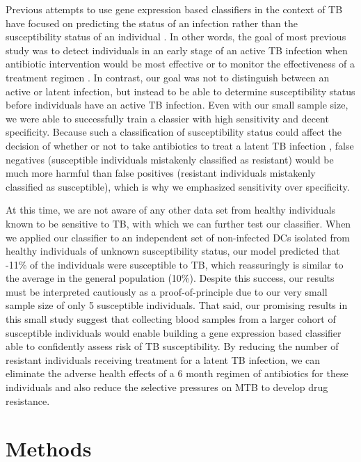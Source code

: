\documentclass[fleqn,10pt]{wlscirep}
\begin{document}
Previous attempts to use gene expression based classifiers in the
context of TB have focused on predicting the status of an infection
rather than the susceptibility status of an individual
\cite{Berry2010, OGarra2013, Blankley2014}. In other words, the goal
of most previous study was to detect individuals in an early stage of
an active TB infection when antibiotic intervention would be most
effective or to monitor the effectiveness of a treatment regimen
\cite{Maertzdorf2015}. In contrast, our goal was not to distinguish
between an active or latent infection, but instead to be able to
determine susceptibility status before individuals have an active TB
infection. Even with our small sample size, we were able to
successfully train a classier with high sensitivity and decent
specificity. Because such a classification of susceptibility status
could affect the decision of whether or not to take antibiotics to
treat a latent TB infection \cite{Munoz2015}, false negatives
(susceptible individuals mistakenly classified as resistant) would be
much more harmful than false positives (resistant individuals
mistakenly classified as susceptible), which is why we emphasized
sensitivity over specificity.

At this time, we are not aware of any other data set from healthy
individuals known to be sensitive to TB, with which we can further
test our classifier. When we applied our classifier to an independent
set of non-infected DCs isolated from healthy individuals of unknown
susceptibility status, our model predicted that -11\%
of the individuals were susceptible to TB, which reassuringly is
similar to the average in the general population (10\%). Despite this
success, our results must be interpreted cautiously as a
proof-of-principle due to our very small sample size of only 5
susceptible individuals. That said, our promising results in this
small study suggest that collecting blood samples from a larger cohort
of susceptible individuals would enable building a gene expression
based classifier able to confidently assess risk of TB susceptibility.
By reducing the number of resistant individuals receiving treatment
for a latent TB infection, we can eliminate the adverse health effects
of a 6 month regimen of antibiotics for these individuals and also
reduce the selective pressures on MTB to develop drug resistance.
\section*{Methods}
\end{document}
